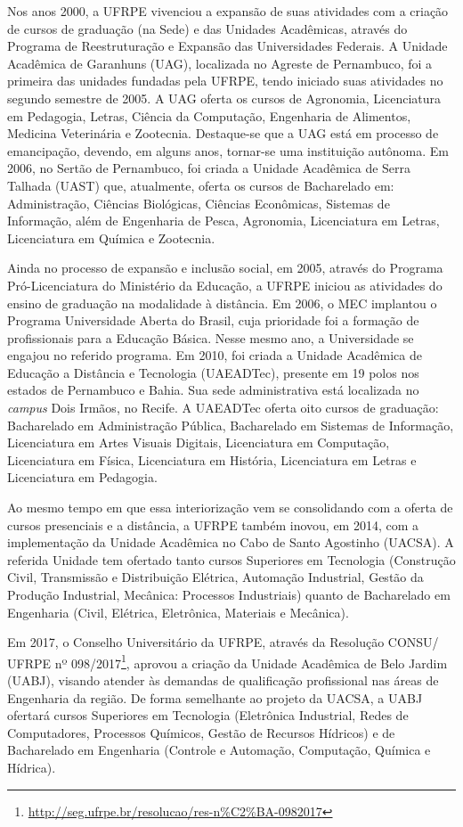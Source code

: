 \documentclass[
	12pt,				%
	openright,			%
  oneside,     %
	a4paper,			%
	english,			%
	french,				%
	spanish,			%
	brazil				%
	]{abntex2}
\begin{document}
Nos anos 2000, a UFRPE vivenciou a expansão de suas atividades com a criação de cursos de graduação (na Sede) e das Unidades Acadêmicas, através do Programa de Reestruturação e Expansão das Universidades Federais. A Unidade Acadêmica de Garanhuns (UAG), localizada no Agreste de Pernambuco, foi a primeira das unidades fundadas pela UFRPE, tendo iniciado suas atividades no segundo semestre de 2005. A UAG oferta os cursos de Agronomia, Licenciatura em Pedagogia, Letras, Ciência da Computação, Engenharia de Alimentos, Medicina Veterinária e Zootecnia. Destaque-se que a UAG está em processo de emancipação, devendo, em alguns anos, tornar-se uma instituição autônoma. Em 2006, no Sertão de Pernambuco, foi criada a Unidade Acadêmica de Serra Talhada (UAST) que, atualmente, oferta os cursos de Bacharelado em: Administração, Ciências Biológicas, Ciências Econômicas, Sistemas de Informação, além de Engenharia de Pesca, Agronomia, Licenciatura em Letras, Licenciatura em Química e Zootecnia.

Ainda no processo de expansão e inclusão social, em 2005, através do Programa Pró-Licenciatura do Ministério da Educação, a UFRPE iniciou as atividades do ensino de graduação na modalidade à distância. Em 2006, o MEC implantou o Programa Universidade Aberta do Brasil, cuja prioridade foi a formação de profissionais para a Educação Básica. Nesse mesmo ano, a Universidade se engajou no referido programa. Em 2010, foi criada a Unidade Acadêmica de Educação a Distância e Tecnologia (UAEADTec), presente em 19 polos nos estados de Pernambuco e Bahia. Sua sede administrativa está localizada no \textit{campus} Dois Irmãos, no Recife. A UAEADTec oferta oito cursos de graduação: Bacharelado em Administração Pública, Bacharelado em Sistemas de Informação, Licenciatura em Artes Visuais Digitais, Licenciatura em Computação, Licenciatura em Física, Licenciatura em História, Licenciatura em Letras e Licenciatura em Pedagogia.

Ao mesmo tempo em que essa interiorização vem se consolidando com a oferta de cursos presenciais e a distância, a UFRPE também inovou, em 2014, com a implementação da Unidade Acadêmica no Cabo de Santo Agostinho (UACSA). A referida Unidade tem ofertado tanto cursos Superiores em Tecnologia (Construção Civil, Transmissão e Distribuição Elétrica, Automação Industrial, Gestão da Produção Industrial, Mecânica: Processos Industriais) quanto de Bacharelado em Engenharia (Civil, Elétrica, Eletrônica, Materiais e Mecânica).

Em 2017, o Conselho Universitário da UFRPE, através da Resolução CONSU/ UFRPE nº 098/2017\footnote{\url{http://seg.ufrpe.br/resolucao/res-n\%C2\%BA-0982017}}, aprovou a criação da Unidade Acadêmica de Belo Jardim (UABJ), visando atender às demandas de qualificação profissional nas áreas de Engenharia da região. De forma semelhante ao projeto da UACSA, a UABJ ofertará cursos Superiores em Tecnologia (Eletrônica Industrial, Redes de Computadores, Processos Químicos, Gestão de Recursos Hídricos) e de Bacharelado em Engenharia (Controle e Automação, Computação, Química e Hídrica).
\end{document}
